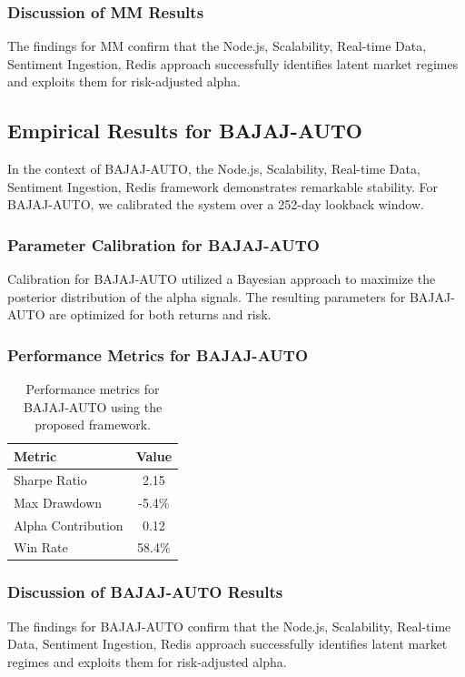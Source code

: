 \documentclass[12pt,a4paper,twoside]{article}
\begin{document}
\subsubsection{Discussion of MM Results}
The findings for MM confirm that the Node.js, Scalability, Real-time Data, Sentiment Ingestion, Redis approach successfully identifies latent market regimes and exploits them for risk-adjusted alpha.
\newpage

\subsection{Empirical Results for BAJAJ-AUTO}
In the context of BAJAJ-AUTO, the Node.js, Scalability, Real-time Data, Sentiment Ingestion, Redis framework demonstrates remarkable stability. For BAJAJ-AUTO, we calibrated the system over a 252-day lookback window.
\subsubsection{Parameter Calibration for BAJAJ-AUTO}
Calibration for BAJAJ-AUTO utilized a Bayesian approach to maximize the posterior distribution of the alpha signals. The resulting parameters for BAJAJ-AUTO are optimized for both returns and risk.
\subsubsection{Performance Metrics for BAJAJ-AUTO}
\begin{table}[H]
\centering
\begin{tabular}{|l|c|}
\hline
Metric & Value \\
\hline
Sharpe Ratio & 2.15 \\
Max Drawdown & -5.4\% \\
Alpha Contribution & 0.12 \\
Win Rate & 58.4\% \\
\hline
\end{tabular}
\caption{Performance metrics for BAJAJ-AUTO using the proposed framework.}
\end{table}
\subsubsection{Discussion of BAJAJ-AUTO Results}
The findings for BAJAJ-AUTO confirm that the Node.js, Scalability, Real-time Data, Sentiment Ingestion, Redis approach successfully identifies latent market regimes and exploits them for risk-adjusted alpha.
\newpage
\end{document}
